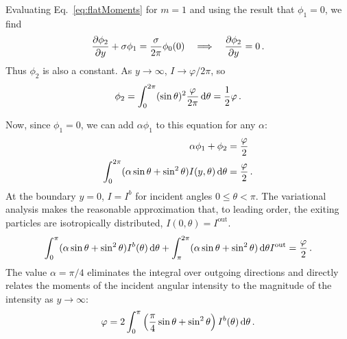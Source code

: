 Evaluating Eq.~\eqref{eq:flatMoments} for $m=1$ and using the result that
$\phi_{1}=0$, we find
\begin{equation*}
  \frac{\partial \phi_{2}}{\partial y}
  + \sigma \phi_{1}
  = \frac{\sigma}{2\pi} \phi_{0} (0)
  \quad \Longrightarrow \quad
  \frac{\partial \phi_{2}}{\partial y} = 0\,.
\end{equation*}
Thus $\phi_{2}$ is also a constant. As $y\to\infty$, $I\to\varphi/2\pi$, so
\begin{equation*}
  \phi_{2} = \int_{0}^{2\pi} (\sin\theta)^2 \frac{\varphi}{2\pi} \mathop{}\!\mathrm{d}\theta
  = \frac{1}{2} \varphi\,.
\end{equation*}

Now, since $\phi_1=0$, we can add $\alpha \phi_1$ to this equation for any
$\alpha$:
\begin{align*}
 \alpha\phi_1 + \phi_{2} &= \frac{\varphi}{2} \\
 \int_{0}^{2\pi} (\alpha \sin\theta + \sin^2\theta)
 I(y,\theta) \mathop{}\!\mathrm{d}\theta
 &= \frac{\varphi}{2}\,.
\end{align*}
At the boundary $y=0$, $I=I^b$ for incident angles $0 \le \theta < \pi$. The
variational analysis makes the reasonable approximation that, to leading order,
the exiting particles are isotropically distributed, $I(0,\theta)=I^\text{out}$.
\begin{equation*}
 \int_{0}^{\pi} (\alpha \sin\theta + \sin^2\theta)
 I^b(\theta) \mathop{}\!\mathrm{d}\theta
 + \int_{\pi}^{2\pi} (\alpha \sin\theta + \sin^2\theta)\mathop{}\!\mathrm{d}\theta I^\text{out}
 = \frac{\varphi}{2}\,.
\end{equation*}
The value $\alpha=\pi/4$ eliminates the integral over outgoing directions and
directly relates the moments of the incident angular intensity to the
magnitude of the intensity as $y\to\infty$:
\begin{equation}\label{eq:varBoundary}
 \varphi = 2\int_{0}^{\pi} \left( \frac{\pi}{4} \sin\theta + \sin^2\theta \right)
 I^b(\theta) \mathop{}\!\mathrm{d}\theta
 \,.
\end{equation}


